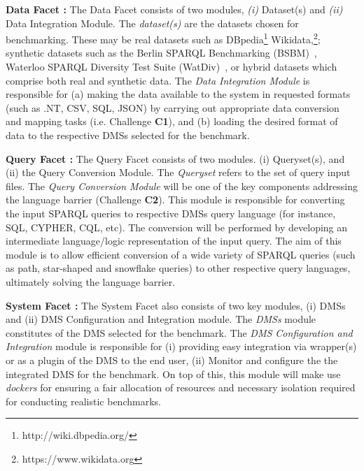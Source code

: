 \documentclass{llncs}
\begin{document}
        \textbf{Data Facet :} The Data Facet consists of two modules, \textit{(i)} Dataset(s) and \textit{(ii)} Data Integration Module. The \textit{dataset(s)} are the datasets chosen for benchmarking. These may be real datasets such as DBpedia\footnote{http://wiki.dbpedia.org/} Wikidata,\footnote{https://www.wikidata.org}; synthetic datasets such as the Berlin SPARQL Benchmarking (BSBM)~\cite{Bizer2009TheBS}, Waterloo SPARQL Diversity Test Suite (WatDiv)~\cite{alucc2014diversified}, or hybrid datasets which comprise both real and synthetic data. 
        The \textit{Data Integration Module} is responsible for (a) making the data available to the system in requested formats (such as .NT, CSV, SQL, JSON) by carrying out appropriate data conversion and mapping tasks (i.e. Challenge \textbf{C1}), and (b) loading the desired format of data to the respective DMSs selected for the benchmark. 
        
        \textbf{Query Facet :} The Query Facet consists of two modules. (i) Queryset(s), and (ii) the Query Conversion Module. The \textit{Queryset} refers to the set of query input files. The \textit{Query Conversion Module} will be one of the key components addressing the language barrier (Challenge \textbf{C2}). This module is responsible for converting the input SPARQL queries to respective DMSs query language (for instance, SQL, CYPHER, CQL, etc). The conversion will be performed by developing an intermediate language/logic representation of the input query. The aim of this module is to allow efficient conversion of a wide variety of SPARQL queries (such as path, star-shaped and snowflake queries) to other respective query languages, ultimately solving the language barrier.
        
        \textbf{System Facet :} The System Facet also consists of two key modules, (i) DMSs and (ii) DMS Configuration and Integration module. The \textit{DMSs} module  constitutes of the DMS selected for the benchmark. The \textit{DMS Configuration and Integration} module is responsible for (i) providing easy integration via wrapper(s) or as a plugin of the DMS to the end user, (ii) Monitor and configure the the integrated DMS for the benchmark. On top of this, this module will make use \textit{dockers} for ensuring a fair allocation of resources and necessary isolation required for conducting realistic benchmarks. 
        
\end{document}
